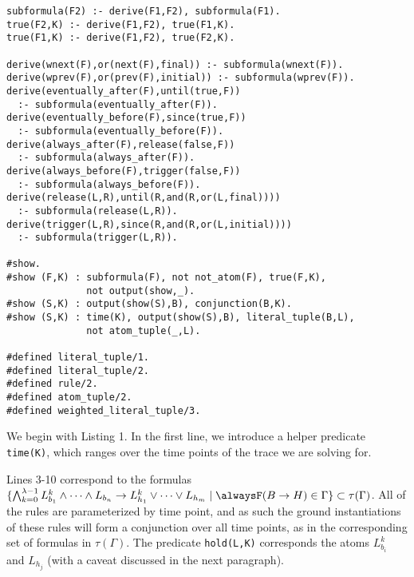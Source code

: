 \begin{center}
\begin{minipage}{\linewidth}
  \begin{lstlisting}[language=clingo, label={lst:meta-telingo2}]
subformula(F2) :- derive(F1,F2), subformula(F1).
true(F2,K) :- derive(F1,F2), true(F1,K).
true(F1,K) :- derive(F1,F2), true(F2,K).

derive(wnext(F),or(next(F),final)) :- subformula(wnext(F)).
derive(wprev(F),or(prev(F),initial)) :- subformula(wprev(F)).
derive(eventually_after(F),until(true,F)) 
  :- subformula(eventually_after(F)).
derive(eventually_before(F),since(true,F)) 
  :- subformula(eventually_before(F)).
derive(always_after(F),release(false,F)) 
  :- subformula(always_after(F)).
derive(always_before(F),trigger(false,F)) 
  :- subformula(always_before(F)).
derive(release(L,R),until(R,and(R,or(L,final)))) 
  :- subformula(release(L,R)).
derive(trigger(L,R),since(R,and(R,or(L,initial)))) 
  :- subformula(trigger(L,R)).

#show.
#show (F,K) : subformula(F), not not_atom(F), true(F,K), 
              not output(show,_).
#show (S,K) : output(show(S),B), conjunction(B,K).
#show (S,K) : time(K), output(show(S),B), literal_tuple(B,L), 
              not atom_tuple(_,L).

#defined literal_tuple/1.
#defined literal_tuple/2.
#defined rule/2.
#defined atom_tuple/2.
#defined weighted_literal_tuple/3.
\end{lstlisting}
\end{minipage}
\end{center}

We begin with Listing 1. In the first line, we introduce a helper
predicate \verb|time(K)|, which ranges over the time points of the trace we
are solving for. 

Lines 3-10 correspond to the formulas
$\{ \bigwedge_{k=0}^{\lambda-1} L_{b_1}^k \land \dots \land L_{b_n}
\rightarrow L_{h_1}^k \lor \dots \lor L_{h_m} \mid \tempruleshort \in
\Gamma \} \subset \tau(\Gamma)$. All of the rules are parameterized by
time point, and as such the ground instantiations of these rules will
form a conjunction over all time points, as in the corresponding set
of formulas in $\tau(\Gamma)$. The predicate \verb|hold(L,K)|
corresponds the atoms $L_{b_i}^k$ and $L_{h_j}$ (with a caveat
discussed in the next paragraph).


